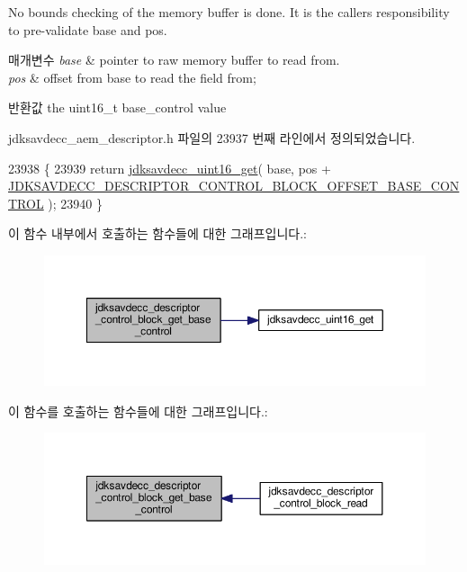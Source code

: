 No bounds checking of the memory buffer is done. It is the caller\textquotesingle{}s responsibility to pre-\/validate base and pos.


\begin{DoxyParams}{매개변수}
{\em base} & pointer to raw memory buffer to read from. \\
\hline
{\em pos} & offset from base to read the field from; \\
\hline
\end{DoxyParams}
\begin{DoxyReturn}{반환값}
the uint16\+\_\+t base\+\_\+control value 
\end{DoxyReturn}


jdksavdecc\+\_\+aem\+\_\+descriptor.\+h 파일의 23937 번째 라인에서 정의되었습니다.


\begin{DoxyCode}
23938 \{
23939     \textcolor{keywordflow}{return} \hyperlink{group__endian_ga3fbbbc20be954aa61e039872965b0dc9}{jdksavdecc\_uint16\_get}( base, pos + 
      \hyperlink{group__descriptor__control__block_gab2953043860b016448ef33b396c9e528}{JDKSAVDECC\_DESCRIPTOR\_CONTROL\_BLOCK\_OFFSET\_BASE\_CONTROL}
       );
23940 \}
\end{DoxyCode}


이 함수 내부에서 호출하는 함수들에 대한 그래프입니다.\+:
\nopagebreak
\begin{figure}[H]
\begin{center}
\leavevmode
\includegraphics[width=350pt]{group__descriptor__control__block_ga23503e36956db5a06a001820db961730_cgraph}
\end{center}
\end{figure}




이 함수를 호출하는 함수들에 대한 그래프입니다.\+:
\nopagebreak
\begin{figure}[H]
\begin{center}
\leavevmode
\includegraphics[width=350pt]{group__descriptor__control__block_ga23503e36956db5a06a001820db961730_icgraph}
\end{center}
\end{figure}


